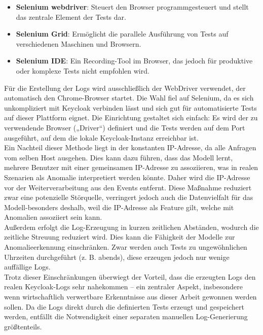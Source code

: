 \documentclass[a4paper,12pt]{article}
\begin{document}
	\begin{itemize}
		\item \textbf{Selenium \gls{webdriver}}: Steuert den Browser programmgesteuert und stellt das zentrale Element der Tests dar.
		\item \textbf{Selenium Grid}: Ermöglicht die parallele Ausführung von Tests auf verschiedenen Maschinen und Browsern.
		\item \textbf{Selenium IDE}: Ein Recording-Tool im Browser, das jedoch für produktive oder komplexe Tests nicht empfohlen wird.
	\end{itemize}
	Für die Erstellung der Logs wird ausschließlich der WebDriver verwendet, der automatisch den Chrome-Browser startet. Die Wahl fiel auf Selenium, da es sich unkompliziert mit Keycloak verbinden lässt und sich gut für automatisierte Tests auf dieser Plattform eignet. Die Einrichtung gestaltet sich einfach: Es wird der zu verwendende Browser („Driver“) definiert und die Tests werden auf dem Port ausgeführt, auf dem die lokale Keycloak-Instanz erreichbar ist.
	\\[0.5em]
	Ein Nachteil dieser Methode liegt in der konstanten IP-Adresse, da alle Anfragen vom selben Host ausgehen. Dies kann dazu führen, dass das Modell lernt, mehrere Benutzer mit einer gemeinsamen IP-Adresse zu assoziieren, was in realen Szenarien als Anomalie interpretiert werden könnte. Daher wird die IP-Adresse vor der Weiterverarbeitung aus den Events entfernt. Diese Maßnahme reduziert zwar eine potenzielle Störquelle, verringert jedoch auch die Datenvielfalt für das Modell-besonders deshalb, weil die IP-Adresse als Feature gilt, welche mit Anomalien assoziiert sein kann.
	\\[0.5em]
	Außerdem erfolgt die Log-Erzeugung in kurzen zeitlichen Abständen, wodurch die zeitliche Streuung reduziert wird. Dies kann die Fähigkeit der Modelle zur Anomalieerkennung einschränken. Zwar werden auch Tests zu ungewöhnlichen Uhrzeiten durchgeführt (z. B. abends), diese erzeugen jedoch nur wenige auffällige Logs.
	\\[0.5em]
	Trotz dieser Einschränkungen überwiegt der Vorteil, dass die erzeugten Logs den realen Keycloak-Logs sehr nahekommen – ein zentraler Aspekt, insbesondere wenn wirtschaftlich verwertbare Erkenntnisse aus dieser Arbeit gewonnen werden sollen. Da die Logs direkt durch die definierten Tests erzeugt und gespeichert werden, entfällt die Notwendigkeit einer separaten manuellen Log-Generierung größtenteils.
	
\end{document}
